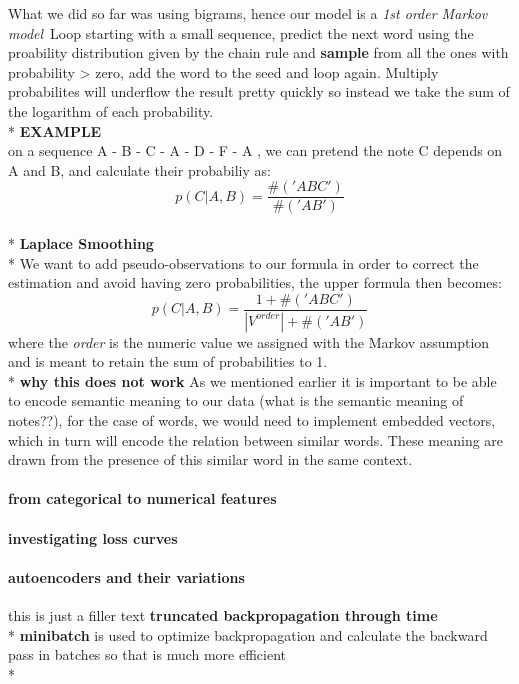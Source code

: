 \documentclass[12pt]{article}
\begin{document}
    What we did so far was using bigrams, hence our model is a \textit{1st order Markov model}\
    Loop starting with a small sequence, predict the next word using the proability distribution given by the chain rule and \textbf{sample} from all the ones with probability > zero, add the word to the seed and loop again. Multiply probabilites will underflow the result pretty quickly so instead we take the sum of the logarithm of each probability.
    \vspace{10pt}
    \\*
    \textbf{EXAMPLE} \\ on a sequence A - B - C - A - D - F - A , we can pretend the note C depends on A and B, and calculate their probabiliy as: \newline
    \[p(C|A,B)=\frac{\#('ABC')}{\#('AB')}\]
    \vspace{10pt}
    \\*
    \textbf{Laplace Smoothing}\\*
    We want to add pseudo-observations to our formula in order to correct the estimation and avoid having zero probabilities, the upper formula then becomes:
    \[p(C|A,B)=\frac{1 + \#('ABC')}{|V^{order}|+\#('AB')}\]
    where the \textit{order} is the numeric value we assigned with the Markov assumption and is meant to retain the sum of probabilities to 1.
    \\*
    \textbf{why this does not work}
    As we mentioned earlier it is important to be able to encode semantic meaning to our data (what is the semantic meaning of notes??), for the case of words, we would need to implement embedded vectors, which in turn will encode the relation between similar words. These meaning are drawn from the presence of this similar word in the same context.

  \paragraph{from categorical to numerical features}
  \paragraph{investigating loss curves}
  \paragraph{autoencoders and their variations}
  this is just a filler text
  \textbf{truncated backpropagation through time}\\*
  \textbf{minibatch} is used to optimize backpropagation and calculate the backward pass in batches so that is much more efficient \\*
\end{document}
